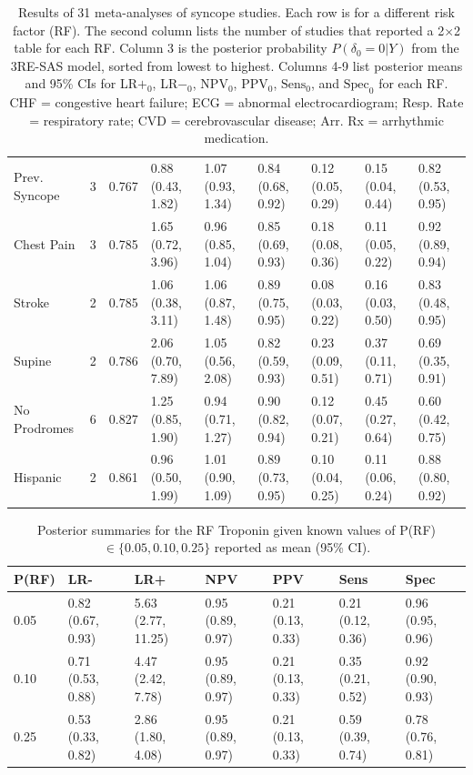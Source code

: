 \documentclass[AMA,STIX1COL]{WileyNJD-v2}
\begin{document}
\begin{table}
\begin{tabular}{lclllllll}
  Prev. Syncope &    3 & 0.767 & 0.88 (0.43, 1.82) & 1.07 (0.93, 1.34) & 0.84 (0.68, 0.92) & 0.12 (0.05, 0.29) & 0.15 (0.04, 0.44) & 0.82 (0.53, 0.95) \\ 
  Chest Pain &    3 & 0.785 & 1.65 (0.72, 3.96) & 0.96 (0.85, 1.04) & 0.85 (0.69, 0.93) & 0.18 (0.08, 0.36) & 0.11 (0.05, 0.22) & 0.92 (0.89, 0.94) \\ 
  Stroke &    2 & 0.785 & 1.06 (0.38, 3.11) & 1.06 (0.87, 1.48) & 0.89 (0.75, 0.95) & 0.08 (0.03, 0.22) & 0.16 (0.03, 0.50) & 0.83 (0.48, 0.95) \\ 
  Supine &    2 & 0.786 & 2.06 (0.70, 7.89) & 1.05 (0.56, 2.08) & 0.82 (0.59, 0.93) & 0.23 (0.09, 0.51) & 0.37 (0.11, 0.71) & 0.69 (0.35, 0.91) \\ 
  No Prodromes &    6 & 0.827 & 1.25 (0.85, 1.90) & 0.94 (0.71, 1.27) & 0.90 (0.82, 0.94) & 0.12 (0.07, 0.21) & 0.45 (0.27, 0.64) & 0.60 (0.42, 0.75) \\ 
  Hispanic &    2 & 0.861 & 0.96 (0.50, 1.99) & 1.01 (0.90, 1.09) & 0.89 (0.73, 0.95) & 0.10 (0.04, 0.25) & 0.11 (0.06, 0.24) & 0.88 (0.80, 0.92) \\ 
   \bottomrule
\end{tabular}
\caption{Results of 31 meta-analyses of syncope studies. Each row is for a different risk factor (RF). The second column lists the number of studies that reported a 2$\times$2 table for each RF. Column 3 is the posterior probability $P(\delta_0 = 0 \vert Y)$ from the 3RE-SAS model, sorted from lowest to highest. Columns 4-9 list posterior means and 95\% CIs for LR$+_0$, LR$-_0$, $\text{NPV}_0$, $\text{PPV}_0$, $\text{Sens}_0$, and $\text{Spec}_0$ for each RF. \\
CHF = congestive heart failure; ECG = abnormal electrocardiogram; Resp. Rate = respiratory rate; CVD = cerebrovascular disease; Arr. Rx = arrhythmic medication.} 
\label{table:syncope}
\end{table}

\restoregeometry

\clearpage


\begin{table}
\centering
\begin{tabular}{lllllll}
  \hline
P(RF) & LR- & LR+ & NPV & PPV & Sens & Spec \\ 
  \hline
0.05 & 0.82 (0.67, 0.93) & 5.63 (2.77, 11.25) & 0.95 (0.89, 0.97) & 0.21 (0.13, 0.33) & 0.21 (0.12, 0.36) & 0.96 (0.95, 0.96) \\ 
  0.10 & 0.71 (0.53, 0.88) & 4.47 (2.42, 7.78) & 0.95 (0.89, 0.97) & 0.21 (0.13, 0.33) & 0.35 (0.21, 0.52) & 0.92 (0.90, 0.93) \\ 
  0.25 & 0.53 (0.33, 0.82) & 2.86 (1.80, 4.08) & 0.95 (0.89, 0.97) & 0.21 (0.13, 0.33) & 0.59 (0.39, 0.74) & 0.78 (0.76, 0.81) \\ 
   \hline
\end{tabular}
\caption{Posterior summaries for the RF Troponin given known values of P(RF)$\in \{0.05, 0.10, 0.25\}$ reported as mean (95\% CI).} 
\label{table:troponin}
\end{table}
\end{document}
